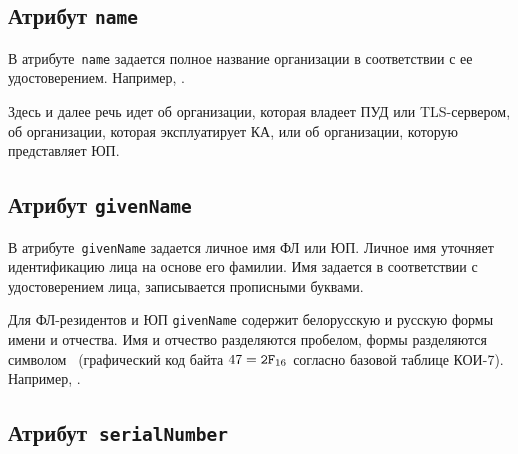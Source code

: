 
\subsection{Атрибут \texttt{name}}\label{ENTITIES.Id.N}

В атрибуте~\texttt{name} задается полное название организации
в соответствии с ее удостоверением. Например, .  

Здесь и далее речь идет об организации,
которая владеет ПУД или TLS-сервером, 
об организации, которая эксплуатирует КА,
или об организации, которую представляет ЮП.

\subsection{Атрибут \texttt{givenName}}\label{ENTITIES.Id.GN}

В атрибуте~\texttt{givenName} задается личное имя ФЛ или ЮП.
Личное имя уточняет идентификацию лица на основе его фамилии.
%
Имя задается в соответствии с удостоверением лица, 
записывается прописными буквами. 

Для ФЛ-резидентов и ЮП \texttt{givenName} содержит белорусскую и русскую 
формы имени и отчества. Имя и отчество разделяются пробелом, формы 
разделяются символом~\str{/} (графический код байта $47=\texttt{2F}_{16}$ 
согласно базовой таблице КОИ-7). 
Например, .

\subsection{Атрибут~\texttt{serialNumber}}\label{ENTITIES.Id.SN}


